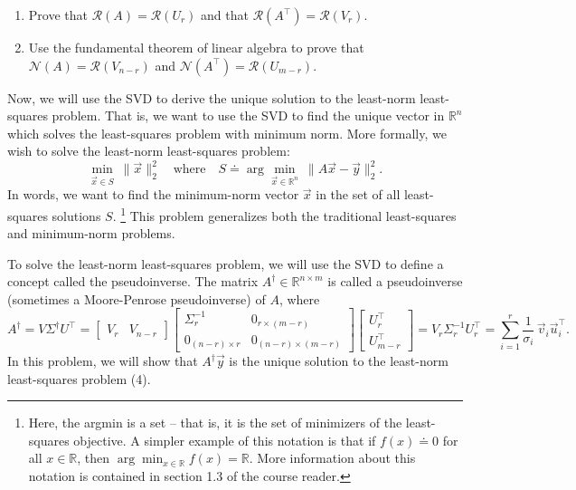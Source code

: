 \documentclass[
  12pt,
]{fphw}
\begin{document}
\begin{enumerate}
\item[(a)] Prove that $\mathcal{R}(A) = \mathcal{R}(U_r)$ and that $\mathcal{R}\!\left(A^\top\right) = \mathcal{R}(V_r)$.

\item[(b)] Use the fundamental theorem of linear algebra to prove that $\mathcal{N}(A) = \mathcal{R}(V_{n-r})$ and $\mathcal{N}\!\left(A^\top\right) = \mathcal{R}(U_{m-r})$.
\end{enumerate}

Now, we will use the SVD to derive the unique solution to the least-norm least-squares problem. That is, we
want to use the SVD to find the unique vector in $\mathbb{R}^n$ which solves the least-squares problem with minimum norm.
More formally, we wish to solve the least-norm least-squares problem:
\[
\min_{\vec x\in S}\ \|\vec x\|_2^2
\quad\text{where}\quad
S \doteq \arg\min_{\vec x\in \mathbb{R}^n}\ \|A\vec x - \vec y\|_2^2.
\tag{4}
\]
In words, we want to find the minimum-norm vector $\vec x$ in the set of all least-squares solutions $S$.%
\footnote{Here, the argmin is a set -- that is, it is the set of minimizers of the least-squares objective. A simpler example of this notation is that if
$f(x)\doteq 0$ for all $x \in \mathbb{R}$, then $\arg\min_{x\in\mathbb{R}} f(x) = \mathbb{R}$. More information about this notation is contained in section 1.3 of the course reader.}
This problem generalizes both the traditional least-squares and minimum-norm problems.

To solve the least-norm least-squares problem, we will use the SVD to define a concept called the pseudoinverse.
The matrix $A^\dagger \in \mathbb{R}^{n\times m}$ is called a pseudoinverse (sometimes a Moore-Penrose pseudoinverse) of $A$, where
\[
A^\dagger = V\Sigma^\dagger U^\top
=
\begin{bmatrix}
V_r & V_{n-r}
\end{bmatrix}
\begin{bmatrix}
\Sigma_r^{-1} & 0_{r\times (m-r)}\\
0_{(n-r)\times r} & 0_{(n-r)\times (m-r)}
\end{bmatrix}
\begin{bmatrix}
U_r^\top\\
U_{m-r}^\top
\end{bmatrix}
=
V_r \Sigma_r^{-1} U_r^\top
=
\sum_{i=1}^r \frac{1}{\sigma_i}\,\vec v_i \vec u_i^\top.
\tag{5}
\]
In this problem, we will show that $A^\dagger \vec y$ is the unique solution to the least-norm least-squares problem (4).
\end{document}
